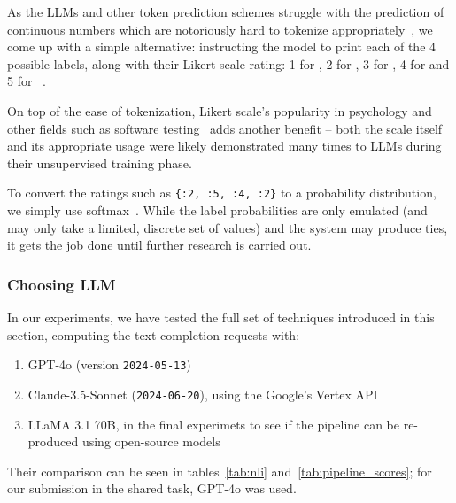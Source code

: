 As the LLMs and other token prediction schemes struggle with the prediction of continuous numbers which are notoriously hard to tokenize appropriately~\cite{golkar2023xvalcontinuousnumberencoding}, we come up with a simple alternative: instructing the model to print each of the 4 possible labels, along with their Likert-scale rating: 1 for , 2 for , 3 for , 4 for  and 5 for ~\cite{likert1932technique}.

On top of the ease of tokenization, Likert scale's popularity in psychology and other fields such as software testing~\cite{likertstudy} adds another benefit -- both the scale itself and its appropriate usage were likely demonstrated many times to LLMs during their unsupervised training phase.

To convert the ratings such as \texttt{\{:2, :5, :4, :2\}} to a probability distribution, we simply use softmax~\cite{NIPS1989_0336dcba}.
While the label probabilities are only emulated (and may only take a limited, discrete set of values) and the system may produce ties, it gets the job done until further research is carried out.

\subsubsection{Choosing LLM}
\label{sec:chosen_llms}
In our experiments, we have tested the full set of techniques introduced in this section, computing the text completion requests with:
\begin{enumerate}
    \item GPT-4o (version \texttt{2024-05-13})
    \item Claude-3.5-Sonnet (\texttt{2024-06-20}), using the Google's Vertex API
    \item LLaMA 3.1 70B, in the final experimets to see if the pipeline can be re-produced using open-source models
\end{enumerate} 

Their comparison can be seen in tables~\ref{tab:nli} and~\ref{tab:pipeline_scores}; for our submission in the \averitec{}  shared task, GPT-4o was used.